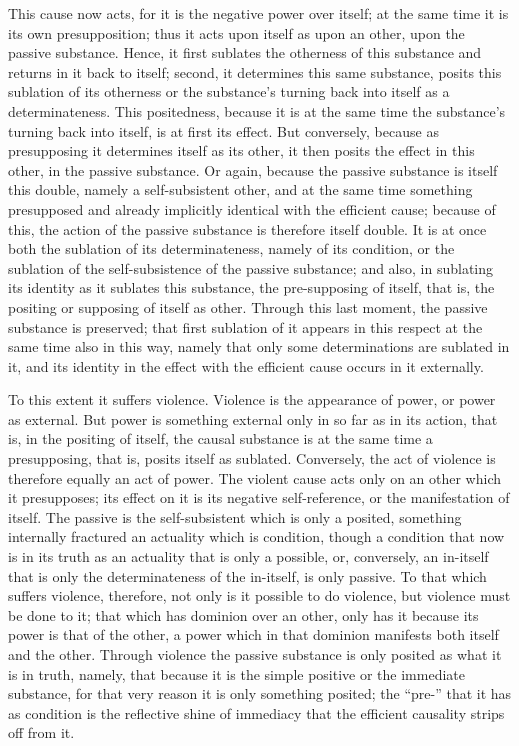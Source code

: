 This cause now acts,
for it is the negative power over itself;
at the same time it is its own presupposition;
thus it acts upon itself as upon an other,
upon the passive substance.
Hence, it first sublates
the otherness of this substance
and returns in it back to itself;
second, it determines this same substance,
posits this sublation of its otherness
or the substance's turning back into itself
as a determinateness.
This positedness, because it is at the same time
the substance's turning back into itself,
is at first its effect.
But conversely, because as presupposing
it determines itself as its other,
it then posits the effect in this other,
in the passive substance.
Or again, because the passive substance is itself this double,
namely a self-subsistent other,
and at the same time something presupposed
and already implicitly identical
with the efficient cause;
because of this, the action of the passive
substance is therefore itself double.
It is at once both the sublation of its determinateness,
namely of its condition,
or the sublation of the self-subsistence
of the passive substance;
and also, in sublating its identity as
it sublates this substance,
the pre-supposing of itself,
that is, the positing or supposing of itself as other.
Through this last moment,
the passive substance is preserved;
that first sublation of it appears in this respect
at the same time also in this way,
namely that only some determinations are sublated in it,
and its identity in the effect
with the efficient cause
occurs in it externally.

To this extent it suffers violence.
Violence is the appearance of power,
or power as external.
But power is something external only in so far as in its
action, that is, in the positing of itself,
the causal substance is at the same
time a presupposing, that is, posits itself as sublated.
Conversely, the act of
violence is therefore equally an act of power.
The violent cause acts only on
an other which it presupposes;
its effect on it is its negative self-reference,
or the manifestation of itself.
The passive is the self-subsistent
which is only a posited,
something internally fractured
an actuality which is condition,
though a condition that now is in its truth
as an actuality that is only a possible,
or, conversely, an in-itself that is only
the determinateness of the in-itself,
is only passive.
To that which suffers violence, therefore,
not only is it possible to do violence,
but violence must be done to it;
that which has dominion over an other,
only has it because its power is that of the other,
a power which in that dominion
manifests both itself and the other.
Through violence the passive substance
is only posited as what it is in truth,
namely, that because it is
the simple positive or the immediate substance,
for that very reason it is only something posited;
the “pre-” that it has as condition is
the reflective shine of immediacy
that the efficient causality strips off from it.

